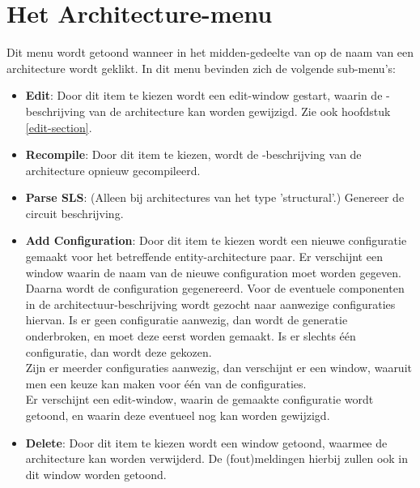\section{Het Architecture-menu}
Dit menu wordt getoond wanneer in het midden-gedeelte van 
op de naam van een architecture wordt geklikt.
In dit menu bevinden zich de volgende sub-menu's:
\begin{itemize}
\item {\bf Edit}: Door dit item te kiezen wordt een edit-window gestart, waarin de
             -beschrijving van de architecture kan worden gewijzigd.
Zie ook hoofdstuk \ref{edit-section}.
\item {\bf Recompile}: Door dit item te kiezen, wordt de -beschrijving van
                  de  architecture opnieuw gecompileerd.
\item {\bf Parse SLS}: (Alleen bij architectures van het type 'structural'.)
                  Genereer de circuit beschrijving.
\item {\bf Add Configuration}: Door dit item te kiezen wordt een nieuwe
                         configuratie gemaakt voor het betreffende
                         entity-architecture paar. Er verschijnt een window
                         waarin de naam van de nieuwe configuration moet
                         worden gegeven. Daarna wordt de configuration
                         gegenereerd. Voor de eventuele componenten in
                         de architectuur-beschrijving wordt gezocht naar
                         aanwezige configuraties hiervan.
                         Is er geen configuratie aanwezig, dan wordt de
                         generatie onderbroken, en moet deze eerst worden
                         gemaakt.  Is er slechts
                         \'e\'en configuratie, dan wordt deze gekozen.\\
                         Zijn er meerder configuraties aanwezig,
                         dan verschijnt er een window, waaruit men een keuze
                         kan maken voor \'e\'en van de configuraties.\\
                         Er verschijnt een edit-window, waarin de
                         gemaakte configuratie wordt getoond, en waarin deze
                         eventueel nog kan worden gewijzigd.
\item {\bf Delete}: Door dit item te kiezen wordt een window getoond, waarmee de
             architecture kan worden verwijderd. De (fout)meldingen hierbij
             zullen ook in dit window worden getoond.
\end{itemize}

